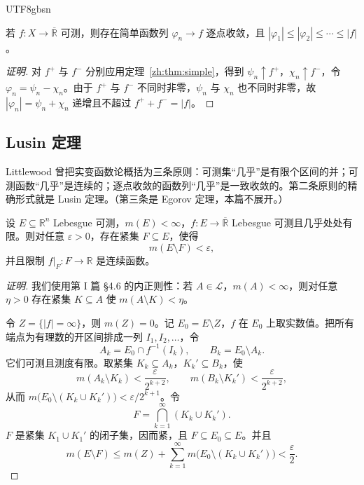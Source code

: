 \documentclass[11pt]{article}
\makeatletter
\newcommand{\envlabel}[1]{\protected@edef\@currentlabel{\themathenv}\label{#1}}
\makeatother
\begin{document}
\begin{CJK*}{UTF8}{gbsn}
\begin{corollary}\envlabel{zh:cor:simple}
若 $f:X\to\overline{\mathbb{R}}$ 可测，则存在简单函数列 $\varphi_{n}\to f$ 逐点收敛，且 $|\varphi_{1}|\leq|\varphi_{2}|\leq\cdots\leq|f|$。
\end{corollary}

\begin{proof}[证明]
对 $f^{+}$ 与 $f^{-}$ 分别应用定理~\ref{zh:thm:simple}，得到 $\psi_{n}\uparrow f^{+}$，$\chi_{n}\uparrow f^{-}$，令 $\varphi_{n}=\psi_{n}-\chi_{n}$。由于 $f^{+}$ 与 $f^{-}$ 不同时非零，$\psi_{n}$ 与 $\chi_{n}$ 也不同时非零，故 $|\varphi_{n}|=\psi_{n}+\chi_{n}$ 递增且不超过 $f^{+}+f^{-}=|f|$。
\end{proof}

\subsection{Lusin 定理}

Littlewood 曾把实变函数论概括为三条原则：可测集“几乎”是有限个区间的并；可测函数“几乎”是连续的；逐点收敛的函数列“几乎”是一致收敛的。第二条原则的精确形式就是 Lusin 定理。（第三条是 Egorov 定理，本篇不展开。）

\begin{theorem}[Lusin]\envlabel{zh:thm:lusin}
设 $E\subseteq\mathbb{R}^{n}$ Lebesgue 可测，$m(E)<\infty$，$f:E\to\overline{\mathbb{R}}$ Lebesgue 可测且几乎处处有限。则对任意 $\varepsilon>0$，存在紧集 $F\subseteq E$，使得
\[
m(E\setminus F)<\varepsilon,
\]
并且限制 $f|_{F}:F\to\mathbb{R}$ 是连续函数。
\end{theorem}

\begin{proof}[证明]
我们使用第 I 篇 \S4.6 的内正则性：若 $A\in\mathcal{L}$，$m(A)<\infty$，则对任意 $\eta>0$ 存在紧集 $K\subseteq A$ 使 $m(A\setminus K)<\eta$。

令 $Z=\{|f|=\infty\}$，则 $m(Z)=0$。记 $E_{0}=E\setminus Z$，$f$ 在 $E_{0}$ 上取实数值。把所有端点为有理数的开区间排成一列 $I_{1},I_{2},\ldots$，令
\[
A_{k}=E_{0}\cap f^{-1}(I_{k}),\qquad B_{k}=E_{0}\setminus A_{k}.
\]
它们可测且测度有限。取紧集 $K_{k}\subseteq A_{k}$，$K_{k}'\subseteq B_{k}$，使
\[
m(A_{k}\setminus K_{k})<\frac{\varepsilon}{2^{k+2}},\qquad m(B_{k}\setminus K_{k}')<\frac{\varepsilon}{2^{k+2}},
\]
从而 $m\big(E_{0}\setminus(K_{k}\cup K_{k}')\big)<\varepsilon/2^{k+1}$。令
\[
F=\bigcap_{k=1}^{\infty}(K_{k}\cup K_{k}').
\]
$F$ 是紧集 $K_{1}\cup K_{1}'$ 的闭子集，因而紧，且 $F\subseteq E_{0}\subseteq E$。并且
\[
m(E\setminus F)\leq m(Z)+\sum_{k=1}^{\infty}m\big(E_{0}\setminus(K_{k}\cup K_{k}')\big)<\frac{\varepsilon}{2}.
\]


\end{proof}
\end{CJK*}
\end{document}
